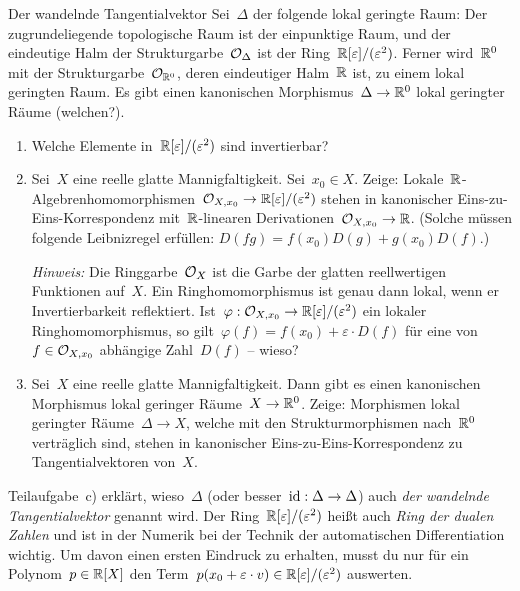 \documentclass{uebblatt}
\newcommand{\dualnumbers}{\ensuremath{\RR[\varepsilon]/(\varepsilon^2)}}
\begin{document}

\begin{aufgabe}{Der wandelnde Tangentialvektor}
Sei~$\Delta$ der folgende lokal geringte Raum: Der zugrundeliegende
topologische Raum ist der einpunktige Raum, und der eindeutige Halm der
Strukturgarbe~$\mathcal{O}_\Delta$ ist der Ring~\dualnumbers.
Ferner wird~$\mathbb{R}^0$ mit der Strukturgarbe~$\mathcal{O}_{\mathbb{R}^0}$, deren eindeutiger
Halm~$\mathbb{R}$ ist, zu einem lokal geringten Raum. Es gibt einen kanonischen
Morphismus~$\Delta \to \mathbb{R}^0$ lokal geringter Räume (welchen?).

\begin{enumerate}
\item Welche Elemente in~\dualnumbers{} sind invertierbar?
\item Sei~$X$ eine reelle glatte Mannigfaltigkeit. Sei~$x_0 \in X$. Zeige:
Lokale~$\mathbb{R}$-Al\-geb\-ren\-ho\-mo\-mor\-phis\-men~$\O_{X,x_0} \to \dualnumbers$ stehen in
kanonischer Eins-zu-Eins-Korrespondenz mit~$\mathbb{R}$-linearen Derivationen~$\mathcal{O}_{X,x_0} \to \mathbb{R}$.
(Solche müssen folgende Leibnizregel erfüllen: $D(fg) = f(x_0) D(g) + g(x_0)
D(f)$.)

\emph{Hinweis:} Die Ringgarbe~$\mathcal{O}_X$ ist die Garbe der glatten reellwertigen
Funktionen auf~$X$. Ein Ringhomomorphismus ist genau dann lokal, wenn er
Invertierbarkeit reflektiert. Ist~$\varphi : \O_{X,x_0} \to \dualnumbers$ ein
lokaler Ringhomomorphismus, so gilt~$\varphi(f) = f(x_0) + \varepsilon \cdot
D(f)$ für eine von~$f \in \mathcal{O}_{X,x_0}$ abhängige Zahl~$D(f)$ -- wieso?

\item Sei~$X$ eine reelle glatte Mannigfaltigkeit. Dann gibt es einen
kanonischen Morphismus lokal geringer Räume~$X \to \mathbb{R}^0$. Zeige: Morphismen
lokal geringter Räume~$\Delta \to X$, welche mit den Strukturmorphismen
nach~$\mathbb{R}^0$ verträglich sind, stehen in kanonischer Eins-zu-Eins-Korrespondenz
zu Tangentialvektoren von~$X$.
\end{enumerate}

Teilaufgabe~c) erklärt, wieso~$\Delta$ (oder besser~$\mathrm{id} : \Delta \to \Delta$)
auch \emph{der wandelnde Tangentialvektor} genannt wird. Der
Ring~$\dualnumbers$ heißt auch \emph{Ring der dualen Zahlen} und ist in der
Numerik bei der Technik der automatischen Differentiation wichtig. Um davon
einen ersten Eindruck zu erhalten, musst du nur für ein Polynom~$p \in \mathbb{R}[X]$
den Term~$p(x_0 + \varepsilon \cdot v) \in \dualnumbers$ auswerten.
\end{aufgabe}
\end{document}
